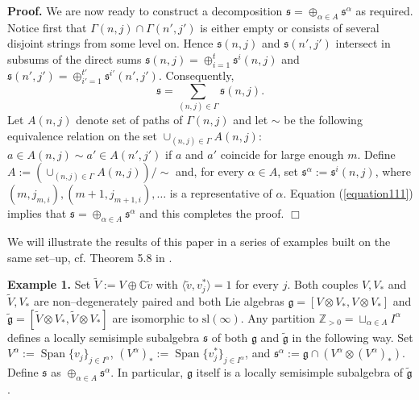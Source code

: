 \documentclass[oneside,leqno,12pt]{article}
\newenvironment{proof}{ \noindent \textbf{Proof.}}{\hfill $\Box$}
\def\gg{\mathfrak{g}}
\def\gs{\mathfrak{s}}
\def\C{\mathbb{C}}
\def\Z{\mathbb{Z}}
\DeclareMathOperator{\Span}{Span}
\renewcommand{\ss}{\mathfrak{s}}
\renewcommand{\gg}{\mathfrak{g}}
\renewcommand{\sl}{\mathrm{sl}}
\begin{document}
\begin{proof}
We are now ready to construct a decomposition $\ss=\oplus_{\alpha\in A}\ss^\alpha$ as required.
Notice first that $\Gamma(n,j) \cap \Gamma(n',j')$ is either empty or consists of several disjoint strings from some level on.
Hence $\ss(n,j)$ and $\ss(n',j')$ intersect in subsums of the direct sums $\ss(n,j)=\oplus_{i=1}^t\ss^i(n,j)$ and $\ss(n',j')=\oplus_{i'=1}^{t'}\ss^{i'}(n',j')$. Consequently,
\begin{equation} \label{equation111}
\ss=\sum_{(n,j)\in\Gamma} \gs(n,j).
\end{equation}
Let $A(n,j)$ 
denote set of paths of $\Gamma(n,j)$ and let
$\sim$ be the following equivalence relation on the set $\cup_{(n,j)\in\Gamma}A(n,j)$: $a\in A(n,j)\sim a'\in A(n',j')$ if $a$ and $a'$ coincide for large enough $m$. Define
 $A:=\left(\cup_{(n,j)\in\Gamma}A(n,j)\right)/\sim$ and, for every $\alpha \in A$, set $\ss^\alpha:=\ss^i(n,j)$, where $(m,j_{m,i}),(m+1,j_{m+1,i}),\dots$ 
 is a representative of $\alpha$. Equation (\ref{equation111}) implies that $\ss=\oplus_{\alpha\in A}\ss^\alpha$ and this 
 completes the proof.
 \end{proof}

We will illustrate the results of this paper in a series of examples built on the same set--up, cf. Theorem 5.8 in \cite{Ba1}.

\noindent\textbf{Example 1.}
Set $\tilde{V} := V \oplus \C \tilde{v}$ with $\langle \tilde{v}, v_j^*\rangle = 1$ for every $j$. Both couples $V, V_*$ and $\tilde{V}, V_*$ are non--degenerately paired
and both Lie algebras $\gg = [V \otimes V_*, V \otimes V_*]$ and  $\tilde{\gg} = [\tilde{V} \otimes V_*, \tilde{V} \otimes V_*]$ are isomorphic to $\sl(\infty)$.
Any partition $\Z_{>0} = \sqcup_{\alpha \in A} I^\alpha$ defines a locally semisimple subalgebra $\gs$ of both $\gg$ and $\tilde{\gg}$ in the following way.
Set $V^\alpha := \Span \{v_j\}_{j \in I^\alpha}$, $(V^\alpha)_* := \Span \{v_j^*\}_{j \in I^\alpha}$, and 
$\gs^\alpha := \gg \cap (V^\alpha \otimes (V^\alpha)_*)$. Define $\gs$ as $\oplus_{\alpha \in A} \gs^\alpha$.
In particular, $\gg$ itself is a locally semisimple subalgebra of $\tilde{\gg}$. 
\end{document}
